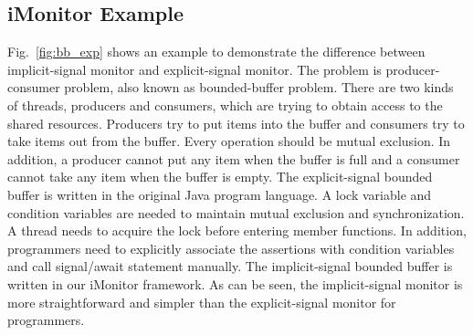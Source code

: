 \documentclass[preprint]{sigplanconf}
\begin{document}
\subsection{iMonitor Example}

Fig.~\ref{fig:bb_exp} shows an example to
demonstrate the difference between implicit-signal monitor and explicit-signal 
monitor. The problem is producer-consumer problem, also known as bounded-buffer
problem. There are two kinds of threads, producers and consumers, which are 
trying to obtain access to the shared resources. Producers try to put items 
into the buffer and consumers try to take items out from the buffer. Every 
operation should be mutual exclusion. In addition, a producer cannot put any 
item when the buffer is full and a consumer cannot take any item when the 
buffer is empty. The explicit-signal bounded buffer is written in the original 
Java program language. A lock variable and condition variables are
needed to maintain mutual exclusion and synchronization. A thread needs to
acquire the lock before entering member functions. In addition, programmers need
to explicitly associate the assertions with condition variables and call
signal/await statement manually. The implicit-signal bounded buffer is written
in our iMonitor framework. As can be seen, the implicit-signal monitor is
more straightforward and simpler than the explicit-signal monitor for
programmers. 
\end{document}
